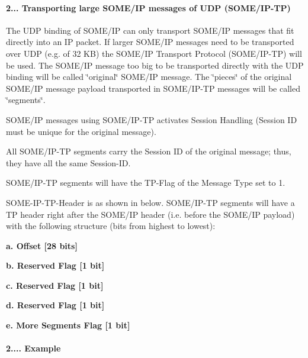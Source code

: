 \paragraph*{2... Transporting large S\+O\+M\+E/\+IP messages of U\+DP (S\+O\+M\+E/\+I\+P-\/\+TP)}


\begin{DoxyItemize}
\item The U\+DP binding of S\+O\+M\+E/\+IP can only transport S\+O\+M\+E/\+IP messages that fit directly into an IP packet. If larger S\+O\+M\+E/\+IP messages need to be transported over U\+DP (e.\+g. of 32 KB) the S\+O\+M\+E/\+IP Transport Protocol (S\+O\+M\+E/\+I\+P-\/\+TP) will be used. The S\+O\+M\+E/\+IP message too big to be transported directly with the U\+DP binding will be called \char`\"{}original\char`\"{} S\+O\+M\+E/\+IP message. The \char`\"{}pieces\char`\"{} of the original S\+O\+M\+E/\+IP message payload transported in S\+O\+M\+E/\+I\+P-\/\+TP messages will be called \char`\"{}segments\char`\"{}.
\item S\+O\+M\+E/\+IP messages using S\+O\+M\+E/\+I\+P-\/\+TP activates Session Handling (Session ID must be unique for the original message).
\item All S\+O\+M\+E/\+I\+P-\/\+TP segments carry the Session ID of the original message; thus, they have all the same Session-\/\+ID.
\item S\+O\+M\+E/\+I\+P-\/\+TP segments will have the T\+P-\/\+Flag of the Message Type set to 1.
\item S\+O\+M\+E-\/\+I\+P-\/\+T\+P-\/\+Header is as shown in below. S\+O\+M\+E/\+I\+P-\/\+TP segments will have a TP header right after the S\+O\+M\+E/\+IP header (i.\+e. before the S\+O\+M\+E/\+IP payload) with the following structure (bits from highest to lowest)\+:

{\bfseries a. Offset \mbox{[}28 bits\mbox{]}}

{\bfseries b. Reserved Flag \mbox{[}1 bit\mbox{]}}

{\bfseries c. Reserved Flag \mbox{[}1 bit\mbox{]}}

{\bfseries d. Reserved Flag \mbox{[}1 bit\mbox{]}}

{\bfseries e. More Segments Flag \mbox{[}1 bit\mbox{]}}
\end{DoxyItemize}

 \paragraph*{2.... Example}


